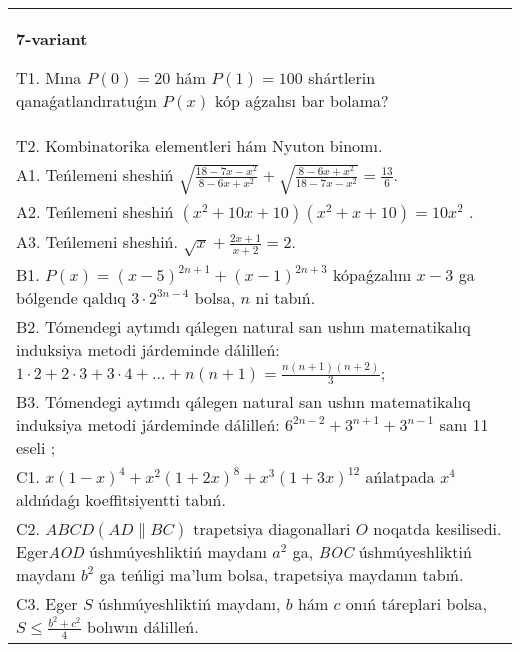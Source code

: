 \documentclass{article}
\begin{document}
\begin{tabular}{m{17cm}}
\textbf{7-variant}
\newline

T1. Mına \(P(0) = 20\) hám \(P(1) = 100\) shártlerin qanaǵatlandıratuǵın \(P(x)\) kóp aǵzalısı bar bolama? \\
T2. Kombinatorika elementleri hám Nyuton binomı. \\
A1. Teńlemeni sheshiń \(\sqrt{\frac{18 - 7x - x^{2}}{8 - 6x + x^{2}}} + \sqrt{\frac{8 - 6x + x^{2}}{18 - 7x - x^{2}}} = \frac{13}{6}\). \\
A2. Teńlemeni sheshiń \(\left( x^{2} + 10x + 10 \right)\left( x^{2} + x + 10 \right) = 10x^{2}\) . \\
A3. Teńlemeni sheshiń. \(\sqrt{x} + \frac{2x + 1}{x + 2} = 2\). \\
B1. \(P(x) = (x - 5)^{2n + 1} + (x - 1)^{2n + 3}\) kópaǵzalını \(x - 3\) ga bólgende qaldıq \(3 \cdot 2^{3n - 4}\) bolsa, \(n\) ni tabıń. \\
B2. Tómendegi aytımdı qálegen natural san ushın matematikalıq induksiya metodi járdeminde dálilleń: \(1 \cdot 2 + 2 \cdot 3 + 3 \cdot 4 + ... + n(n + 1) = \frac{n(n + 1)(n + 2)}{3}\); \\
B3. Tómendegi aytımdı qálegen natural san ushın matematikalıq induksiya metodi járdeminde dálilleń: \(6^{2n - 2} + 3^{n + 1} + 3^{n - 1}\) sanı 11 eseli ; \\
C1. \(x(1 - x)^{4} + x^{2}(1 + 2x)^{8} + x^{3}(1 + 3x)^{12}\) ańlatpada \(x^{4}\) aldıńdaǵı koeffitsiyentti tabıń. \\
C2. \(ABCD(AD\| BC)\) trapetsiya diagonallari \(O\) noqatda kesilisedi. Eger\emph{AOD} úshmúyeshliktiń maydanı \(a^{2}\) ga, \emph{BOC} úshmúyeshliktiń maydanı \(b^{2}\) ga teńligi ma'lum bolsa, trapetsiya maydanın tabıń. \\
C3. Eger \(S\) úshmúyeshliktiń maydanı, \(b\) hám \(c\) onıń táreplari bolsa, \(S \leq \frac{b^{2} + c^{2}}{4}\) bolıwın dálilleń. \\

\end{tabular}
\vspace{1cm}
\end{document}
